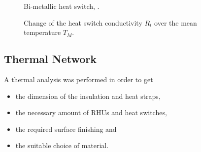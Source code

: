 \begin{figure}[h]
	\centering
	\qquad\qquad
	\caption{Bi-metallic heat switch, \cite{ref_tcs_04}.}
	\label{fig:tcs_switch01}
\end{figure}

\begin{figure}[h]
	\centering
	\qquad
	\caption{Change of the heat switch conductivity $R_t$ over the mean temperature $T_M$.}
	\label{fig:tcs_switch02}
\end{figure}

\subsection{Thermal Network}
A thermal analysis was performed in order to get
\begin{itemize}
	\item the dimension of the insulation and heat straps,
	\item the necessary amount of RHUs and heat switches,
	\item the required surface finishing and
	\item the suitable choice of material.\\
\end{itemize}

